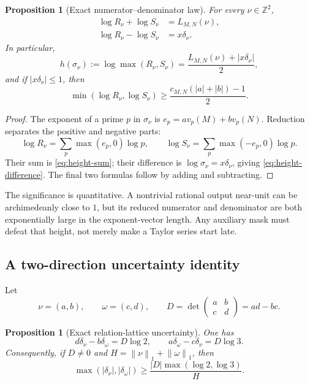 \documentclass[11pt,oneside]{article}
\newtheorem{proposition}[theorem]{Proposition}
\theoremstyle{definition}
\theoremstyle{remark}
\newcommand{\Z}{\mathbb Z}
\newcommand{\normone}[1]{\left\lVert #1\right\rVert_1}
\begin{document}
\begin{proposition}[Exact numerator--denominator law]
\label{prop:height-law}
For every $\nu\in\Z^2$,
\begin{align}
 \log R_\nu+\log S_\nu&=L_{M,N}(\nu),
 \label{eq:height-sum}\\
 \log R_\nu-\log S_\nu&=x\delta_\nu.
 \label{eq:height-difference}
\end{align}
In particular,
\begin{equation}
  h(\sigma_\nu):=\log\max(R_\nu,S_\nu)
  =\frac{L_{M,N}(\nu)+|x\delta_\nu|}{2},
  \label{eq:height-exact}
\end{equation}
and if $|x\delta_\nu|\le1$, then
\begin{equation}
 \min(\log R_\nu,\log S_\nu)
 \ge \frac{c_{M,N}(|a|+|b|)-1}{2}.
 \label{eq:both-sides-large}
\end{equation}
\end{proposition}

\begin{proof}
The exponent of a prime $p$ in $\sigma_\nu$ is
$e_p=a v_p(M)+b v_p(N)$.  Reduction separates the positive and negative parts:
\[
 \log R_\nu=\sum_p\max(e_p,0)\log p,
 \qquad
 \log S_\nu=\sum_p\max(-e_p,0)\log p.
\]
Their sum is \eqref{eq:height-sum}; their difference is
$\log\sigma_\nu=x\delta_\nu$, giving \eqref{eq:height-difference}.  The final two formulas
follow by adding and subtracting.
\end{proof}

The significance is quantitative.  A nontrivial rational output near-unit can be
archimedeanly close to $1$, but its reduced numerator and denominator are both exponentially
large in the exponent-vector length.  Any auxiliary mask must defeat that height, not merely
make a Taylor series start late.

\subsection{A two-direction uncertainty identity}
\label{subsec:uncertainty}

Let
\[
 \nu=(a,b),\qquad \omega=(c,d),\qquad
 D=\det\begin{pmatrix}a&b\\c&d\end{pmatrix}=ad-bc.
\]

\begin{proposition}[Exact relation-lattice uncertainty]
\label{prop:uncertainty}
One has
\begin{equation}
 d\delta_\nu-b\delta_\omega=D\log2,
 \qquad
 a\delta_\omega-c\delta_\nu=D\log3.
 \label{eq:uncertainty-identities}
\end{equation}
Consequently, if $D\ne0$ and
$H=\normone{\nu}+\normone{\omega}$, then
\begin{equation}
 \max(|\delta_\nu|,|\delta_\omega|)
 \ge \frac{|D|\max(\log2,\log3)}{H}.
 \label{eq:uncertainty-bound}
\end{equation}
\end{proposition}
\end{document}

